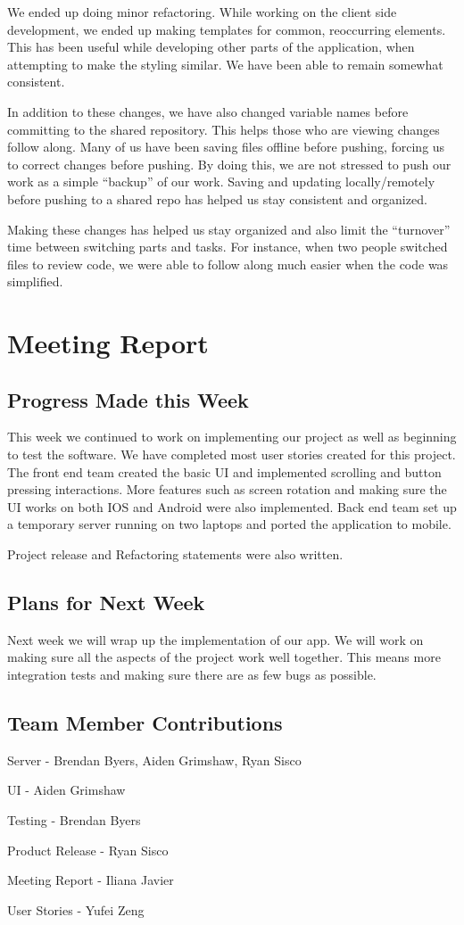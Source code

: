 \documentclass[12pt]{article}
\begin{document}
We ended up doing minor refactoring. While working on the client side
development, we ended up making templates for common, reoccurring elements.
This has been useful while developing other parts of the application, when
attempting to make the styling similar. We have been able to remain somewhat
consistent.

In addition to these changes, we have also changed variable names before
committing to the shared repository. This helps those who are viewing
changes follow along. Many of us have been saving files offline before
pushing, forcing us to correct changes before pushing. By doing this, we are
not stressed to push our work as a simple “backup” of our work. Saving and
updating locally/remotely before pushing to a shared repo has helped us stay
consistent and organized.

Making these changes has helped us stay organized and also limit the
“turnover” time between switching parts and tasks. For instance, when two
people switched files to review code, we were able to follow along much
easier when the code was simplified.

\section{Meeting Report}
\subsection{Progress Made this Week}

This week we continued to work on implementing our project as well as beginning
to test the software. We have completed most user stories created for this
project. The front end team created the basic UI and implemented scrolling and
button pressing interactions. More features such as screen rotation and making
sure the UI works on both IOS and Android were also implemented. Back end team
set up a temporary server running on two laptops and ported the application to
mobile.

Project release and Refactoring statements were also written.


\subsection{Plans for Next Week}

Next week we will wrap up the implementation of our app.  We will work on making
sure all the aspects of the project work well together.  This means more integration
tests and making sure there are as few bugs as possible.

\subsection{Team Member Contributions}

Server - Brendan Byers, Aiden Grimshaw, Ryan Sisco

UI  - Aiden Grimshaw

Testing - Brendan Byers

Product Release - Ryan Sisco

Meeting Report - Iliana Javier

User Stories - Yufei Zeng
\end{document}
